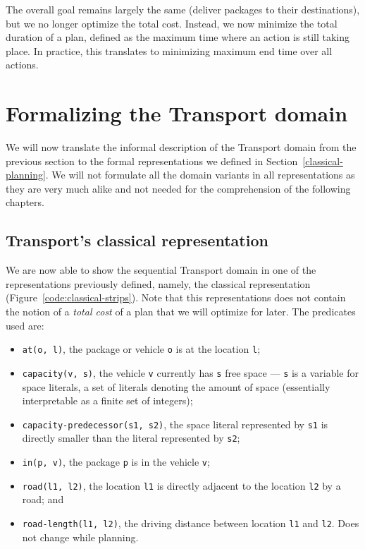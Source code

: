 The overall goal remains largely the same (deliver packages to their destinations), but we no longer optimize the total cost. Instead, we now minimize the total duration of a plan,
defined as the maximum time where an action is still taking place.
In practice, this translates to minimizing maximum end time over all actions.



















\section{Formalizing the Transport domain}

We will now translate the informal description of the Transport domain from the previous section to the formal representations we defined in Section~\ref{classical-planning}. We will not formulate all the domain variants in all representations as
they are very much alike and not needed for the comprehension of the following chapters.

\subsection{Transport's classical representation}\label{transport-classical-representation}

We are now able to show the sequential Transport domain in one of the representations
previously defined, namely,
the classical representation (Figure~\ref{code:classical-strips}).
Note that this representations does not contain the notion of a \textit{total cost}
of a plan that we will optimize for later.
The predicates used are:
\begin{itemize}
\item \verb+at(o, l)+, the package or vehicle \verb+o+ is at the
location \verb+l+;
\item \verb+capacity(v, s)+, the vehicle \verb+v+ currently has \verb+s+ free space --- \verb+s+ is a variable for space literals, a set of literals denoting the amount of space (essentially interpretable as a finite set of integers);
\item \verb+capacity-predecessor(s1, s2)+, the space literal represented by \verb+s1+
is directly smaller than the literal represented by \verb+s2+;
\item \verb+in(p, v)+, the package \verb+p+ is in the vehicle \verb+v+;
\item \verb+road(l1, l2)+, the location \verb+l1+ is directly adjacent to the location
\verb+l2+ by a road; and
\item \verb+road-length(l1, l2)+, the driving distance between location \verb+l1+
and \verb+l2+. Does not change while planning.
\end{itemize}

